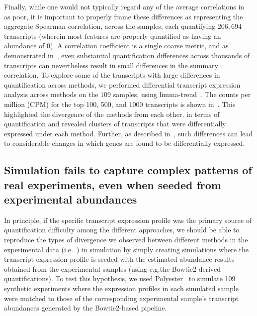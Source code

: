 Finally, while one would not typically regard any of the
  average correlations in~ as poor, it is important to properly
  frame these differences as representing the aggregate Spearman correlation,
  across the samples, each quantifying $206,694$ transcripts (wherein most
  features are properly quantified as having an abundance of $0$). A correlation
  coefficient is a single coarse metric, and as demonstrated
  in~, even substantial quantification differences
  across thousands of transcripts can nevertheless result in small differences
  in the summary correlation. To explore some of the transcripts with large differences
  in quantification across methods, we performed differential transcript
  expression analysis across methods on the $109$ samples, using
  limma-trend~\citep{law2014voom}. The counts per million (CPM) for the top 100,
  500, and 1000 transcripts is shown in~. This highlighted the
  divergence of the methods from each other, in terms of quantification and
  revealed clusters of transcripts that were differentially expressed under each
  method. Further, as described in~, such differences can lead to
  considerable changes in which genes are found to be differentially
  expressed.
  

\subsection{Simulation fails to capture complex patterns of real experiments, even when seeded from experimental abundances}
\label{subsec:sim_from_real}

In principle, if the specific transcript expression
profile was the primary source of quantification difficulty among the different approaches, we
should be able to reproduce the types of divergence we observed between
different methods in the experimental data
(i.e.~) in simulation by simply creating
simulations where the transcript expression profile is seeded with the estimated
abundance results obtained from the experimental samples (using e.g.\@ the
Bowtie2-derived quantifications).
To test this hypothesis, we used Polyester~\citep{polyester} to simulate 109
synthetic experiments where the expression profiles in each simulated sample
were matched to those of the corresponding experimental sample's transcript
abundances generated by the Bowtie2-based pipeline. 

